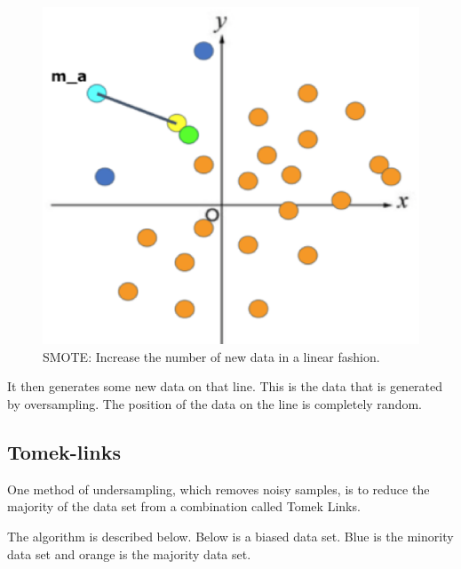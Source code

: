 \begin{center}
    \begin{figure}[ht]
        \caption{SMOTE: Increase the number of new data in a linear fashion.}
        \label{tab:team-rating-features}
        \begin{center}
            \includegraphics[scale=0.6]{image/smote5.eps}
        \end{center}
    \end{figure}
\end{center}

It then generates some new data on that line.
This is the data that is generated by oversampling.
The position of the data on the line is completely random.

\clearpage
\subsection{Tomek-links}

One method of undersampling, which removes noisy samples, is to reduce the majority of the data set from a combination called Tomek Links\cite{TomekLinks}.

The algorithm is described below.
Below is a biased data set.
Blue is the minority data set and orange is the majority data set.

